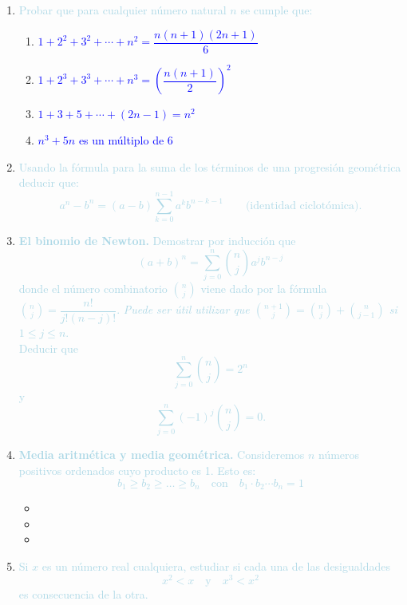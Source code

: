 

\begin{enumerate}[label=\color{red}\textbf{\arabic*)}, leftmargin=*]
	\item \textcolor{lightblue}{Probar que para cualquier número natural $n$ se cumple que:}
	\begin{enumerate}[label=\color{red}\arabic*)]
		\item \textcolor{blue}{$1+2^2+3^2+\cdots+n^2=\dfrac{n(n+1)(2n+1)}{6}$}
		\item \textcolor{blue}{$1+2^3+3^3+\cdots+n^3=\left(\dfrac{n(n+1)}{2}\right)^2$}
		\item \textcolor{blue}{$1+3+5+\cdots+(2n-1)=n^2$}
		\item \textcolor{blue}{$n^3+5n$ es un múltiplo de 6}
	\end{enumerate}
	\item \textcolor{lightblue}{Usando la fórmula para la suma de los términos de una progresión geométrica deducir que: \[ a^n-b^n=(a-b)\sum_{k=0}^{n-1}a^kb^{n-k-1}\qquad\text{(identidad ciclotómica)}. \]}
	
	\item \textcolor{lightblue}{\textbf{El binomio de Newton.} Demostrar por inducción que \[ (a+b)^n=\sum_{j=0}^{n}\binom{n}{j}a^jb^{n-j} \] donde el número combinatorio $\binom{n}{j}$ viene dado por la fórmula $\binom{n}{j}=\dfrac{n!}{j !(n-j)!}$. \textit{Puede ser útil utilizar que $\mathit{\binom{n+1}{j}=\binom{n}{j}+\binom{n}{j-1}}$ si $\mathit{1\le j\le n}$}.\\
	Deducir que \[ \sum_{j=0}^{n}\binom{n}{j}=2^n \] y \[ \sum_{j=0}^{n}(-1)^{j}\binom{n}{j}=0. \]}
	\item \textcolor{lightblue}{\textbf{Media aritmética y media geométrica.} Consideremos $n$ números positivos ordenados cuyo producto es 1. Esto es: \[ b_1\ge b_2\ge\dots\ge b_n\quad\text{con}\quad b_1\cdot b_2\cdots b_n=1 \]}
	\begin{itemize}[label=\color{red}\textbullet]
		\item {}
		\item {}
		\item {}
	\end{itemize}
	\item \textcolor{lightblue}{Si $x$ es un número real cualquiera, estudiar si cada una de las desigualdades \[ x^2<x\quad\mathrm{y}\quad x^3<x^2\] es consecuencia de la otra.}
	

\end{enumerate}
